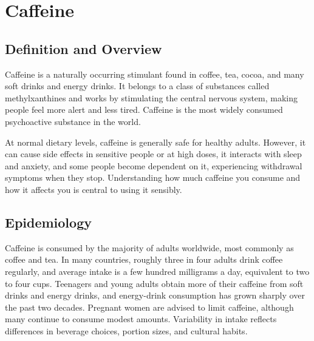 \chapter{Caffeine}

\section*{Definition and Overview}
Caffeine is a naturally occurring stimulant found in coffee, tea, cocoa, and many soft drinks and energy drinks. It belongs to a class of substances called methylxanthines and works by stimulating the central nervous system, making people feel more alert and less tired. Caffeine is the most widely consumed psychoactive substance in the world.

At normal dietary levels, caffeine is generally safe for healthy adults. However, it can cause side effects in sensitive people or at high doses, it interacts with sleep and anxiety, and some people become dependent on it, experiencing withdrawal symptoms when they stop. Understanding how much caffeine you consume and how it affects you is central to using it sensibly.

\section*{Epidemiology}
Caffeine is consumed by the majority of adults worldwide, most commonly as coffee and tea. In many countries, roughly three in four adults drink coffee regularly, and average intake is a few hundred milligrams a day, equivalent to two to four cups. Teenagers and young adults obtain more of their caffeine from soft drinks and energy drinks, and energy-drink consumption has grown sharply over the past two decades. Pregnant women are advised to limit caffeine, although many continue to consume modest amounts. Variability in intake reflects differences in beverage choices, portion sizes, and cultural habits.

